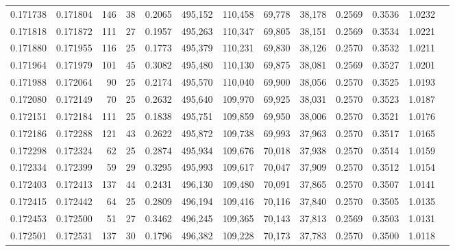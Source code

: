 \begin{tabular}{rrrrrrrrrrrrr}
0.171738 & 0.171804 &   146 &  38 &                                     0.2065 & 495,152 & 110,458 &  69,778 &  38,178 & 0.2569 & 0.3536 & 1.0232 \\
0.171818 & 0.171872 &   111 &  27 &                                     0.1957 & 495,263 & 110,347 &  69,805 &  38,151 & 0.2569 & 0.3534 & 1.0221 \\
0.171880 & 0.171955 &   116 &  25 &                                     0.1773 & 495,379 & 110,231 &  69,830 &  38,126 & 0.2570 & 0.3532 & 1.0211 \\
0.171964 & 0.171979 &   101 &  45 &                                     0.3082 & 495,480 & 110,130 &  69,875 &  38,081 & 0.2569 & 0.3527 & 1.0201 \\
0.171988 & 0.172064 &    90 &  25 &                                     0.2174 & 495,570 & 110,040 &  69,900 &  38,056 & 0.2570 & 0.3525 & 1.0193 \\
0.172080 & 0.172149 &    70 &  25 &                                     0.2632 & 495,640 & 109,970 &  69,925 &  38,031 & 0.2570 & 0.3523 & 1.0187 \\
0.172151 & 0.172184 &   111 &  25 &                                     0.1838 & 495,751 & 109,859 &  69,950 &  38,006 & 0.2570 & 0.3521 & 1.0176 \\
0.172186 & 0.172288 &   121 &  43 &                                     0.2622 & 495,872 & 109,738 &  69,993 &  37,963 & 0.2570 & 0.3517 & 1.0165 \\
0.172298 & 0.172324 &    62 &  25 &                                     0.2874 & 495,934 & 109,676 &  70,018 &  37,938 & 0.2570 & 0.3514 & 1.0159 \\
0.172334 & 0.172399 &    59 &  29 &                                     0.3295 & 495,993 & 109,617 &  70,047 &  37,909 & 0.2570 & 0.3512 & 1.0154 \\
0.172403 & 0.172413 &   137 &  44 &                                     0.2431 & 496,130 & 109,480 &  70,091 &  37,865 & 0.2570 & 0.3507 & 1.0141 \\
0.172415 & 0.172442 &    64 &  25 &                                     0.2809 & 496,194 & 109,416 &  70,116 &  37,840 & 0.2570 & 0.3505 & 1.0135 \\
0.172453 & 0.172500 &    51 &  27 &                                     0.3462 & 496,245 & 109,365 &  70,143 &  37,813 & 0.2569 & 0.3503 & 1.0131 \\
0.172501 & 0.172531 &   137 &  30 &                                     0.1796 & 496,382 & 109,228 &  70,173 &  37,783 & 0.2570 & 0.3500 & 1.0118 \\

\end{tabular}
